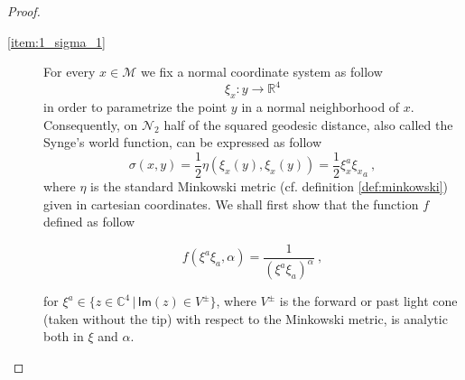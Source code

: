 \documentclass[11pt]{book}
\renewcommand{\Im}{\mathsf{Im}}
\newcommand{\Mcal}{\mathcal{M}}
\newcommand{\Ncal}{\mathcal{N}}
\newcommand{\Rbb}{\mathbb{R}}
\theoremstyle{break}
\begin{document}
\begin{proof}
\begin{description}
\item[\ref{item:1_sigma_1}] For every $x \in \Mcal$ we fix a normal coordinate system as follow
%
\begin{equation}
\xi_x : y \to \Rbb^4 
\label{eq:normal_coord}
\end{equation}
%
in order to parametrize the point $y$ in a normal neighborhood of $x$. Consequently, on $\Ncal_2$ half of the squared geodesic distance, also called the Synge's world function, can be expressed as follow
%
\begin{equation}
\sigma(x,y)= \frac{1}{2}\eta(\xi_x(y),\xi_x(y)) = \frac{1}{2}\xi_x^{a}{\xi_x}_{a} \ , 
\label{eq:sigma_normal_coord}
\end{equation}
%
where $\eta$ is the standard Minkowski metric (cf. definition \ref{def:minkowski}) given in cartesian coordinates. We shall first show that the function $f$ defined as follow

\begin{equation}
f(\xi^a\xi_{a},\alpha) = \frac{1}{(\xi^{a}\xi_{a})^\alpha} \ , 
\label{sigma_reg_normal_coord}
\end{equation}

for $\xi^{a} \in \{z\in \mathbb{C}^4 \,|\,\Im(z) \in V^\pm \}$, where $V^\pm$ is the forward or past light cone (taken without the tip) with respect to the Minkowski metric, is  analytic both in $\xi$ and $\alpha$.



\end{description}
\end{proof}
\end{document}
